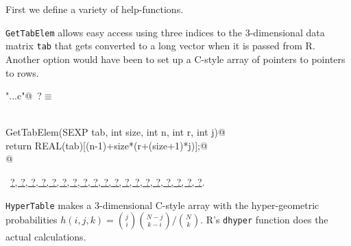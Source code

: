 \documentclass[reqno]{amsart}
\renewcommand{\NWtarget}[2]{\hypertarget{#1}{#2}}
\renewcommand{\NWlink}[2]{\hyperlink{#1}{#2}}
\begin{document}
First we define a variety of help-functions.

\texttt{GetTabElem} allows easy
access using three indices to the 3-dimensional data matrix \texttt{tab} that gets 
converted to a long vector when it is passed from R. Another option would have
been to set up a C-style array of pointers to pointers to rows.

\begin{flushleft} \small
\begin{minipage}{\linewidth}\label{scrap21}\raggedright\small
\NWtarget{nuweb?}{} \verb@"..\src\ReprodCalcs.c"@\nobreak\ {\footnotesize {?}}$\equiv$
\vspace{-1ex}
\begin{list}{}{} \item
\mbox{}\verb@@\\
\mbox{}\verb@double GetTabElem(SEXP tab, int size, int n, int r, int j){@\\
\mbox{}\verb@         return REAL(tab)[(n-1)+size*(r+(size+1)*j)];@\\
\mbox{}\verb@ }@\\
\mbox{}\verb@@{\NWsep}
\end{list}
\vspace{-1.5ex}
\footnotesize
\begin{list}{}{\setlength{\itemsep}{-\parsep}\setlength{\itemindent}{-\leftmargin}}
\item \NWtxtFileDefBy\ \NWlink{nuweb?}{?}\NWlink{nuweb?}{, ?}\NWlink{nuweb?}{, ?}\NWlink{nuweb?}{, ?}\NWlink{nuweb?}{, ?}\NWlink{nuweb?}{, ?}\NWlink{nuweb?}{, ?}\NWlink{nuweb?}{, ?}\NWlink{nuweb?}{, ?}\NWlink{nuweb?}{, ?}\NWlink{nuweb?}{, ?}\NWlink{nuweb?}{, ?}\NWlink{nuweb?}{, ?}\NWlink{nuweb?}{, ?}\NWlink{nuweb?}{, ?}\NWlink{nuweb?}{, ?}\NWlink{nuweb?}{, ?}\NWlink{nuweb?}{, ?}\NWlink{nuweb?}{, ?}.

\item{}
\end{list}
\end{minipage}\vspace{4ex}
\end{flushleft}
\texttt{HyperTable} makes a 3-dimensional C-style array with the hyper-geometric probabilities
$h(i,j,k) =  {\binom{j}{i}}{\binom{N-j}{k-i}} / {\binom{N}{k}}$. R's \texttt{dhyper}
function does the actual calculations.
\end{document}
